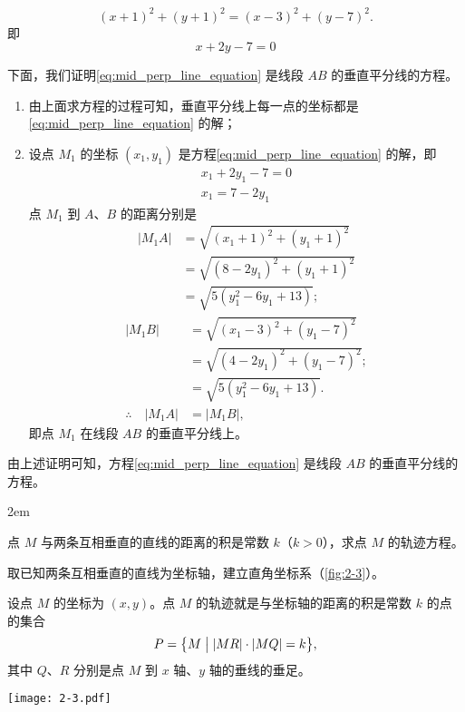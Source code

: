 \medskip\noindent
\[(x+1)^2+(y+1)^2=(x-3)^2+(y-7)^2.\]
即
\begin{equation}
  \label{eq:mid_perp_line_equation}
  x+2y-7=0
\end{equation}

下面，我们证明\cref{eq:mid_perp_line_equation} 是线段 $AB$ 的垂直平分线的方程。
\begin{enumerate}[1 ]
  \item 由上面求方程的过程可知，垂直平分线上每一点的坐标都是\cref{eq:mid_perp_line_equation} 的解；
  \item 设点 $M_1$ 的坐标 $(x_1,y_1)$ 是方程\cref{eq:mid_perp_line_equation} 的解，即
  \begin{gather*}
    x_1+2y_1-7=0\\
    x_1=7-2y_1
  \end{gather*}
  点 $M_1$ 到 $A$、$B$ 的距离分别是
  \begin{align*}
    |M_1A| & = \sqrt{(x_1+1)^2+(y_1+1)^2}\\
           & = \sqrt{(8-2y_1)^2+(y_1+1)^2}\\
           & = \sqrt{5(y_1^2-6y_1+13)};
  \end{align*}
  \begin{align*}
    |M_1B| & = \sqrt{(x_1-3)^2+(y_1-7)^2}\\
           & = \sqrt{(4-2y_1)^2+(y_1-7)^2};\\
           & = \sqrt{5(y_1^2-6y_1+13)}.\\
    \therefore \quad |M_1A| & = |M_1B|,
  \end{align*}
  即点 $M_1$ 在线段 $AB$ 的垂直平分线上。
\end{enumerate}

由上述证明可知，方程\cref{eq:mid_perp_line_equation} 是线段 $AB$ 的垂直平分线的方程。

\medskip\noindent
\begin{minipage}{0.65\linewidth}\parindent2em
\begin{example}
  点 $M$ 与两条互相垂直的直线的距离的积是常数 $k$（$k>0$），求点 $M$ 的轨迹方程。
\end{example}
\begin{solution}
  取已知两条互相垂直的直线为坐标轴，建立直角坐标系（\cref{fig:2-3}）。

  设点 $M$ 的坐标为 $(x,y)$。点 $M$ 的轨迹就是与坐标轴的距离的积是常数 $k$ 的点的集合
  \[P = \bigl\{ M\bigm\vert |MR| \cdot |MQ|= k\bigr\},\]
  其中 $Q$、$R$ 分别是点 $M$ 到 $x$ 轴、$y$ 轴的垂线的垂足。
\end{solution}
\end{minipage}\hfill
\begin{minipage}{0.32\linewidth}\centering
  \begin{figurehere}
    \texttt{[image: 2-3.pdf]}
    \caption{}\label{fig:2-3}
  \end{figurehere}
\end{minipage}

